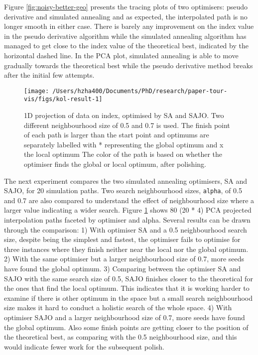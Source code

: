 Figure \ref{fig:noisy-better-geo} presents the tracing plots of two
optimisers: pseudo derivative and simulated annealing and as expected,
the interpolated path is no longer smooth in either case. There is
barely any improvement on the index value in the pseudo derivative
algorithm while the simulated annealing algorithm has managed to get
close to the index value of the theoretical best, indicated by the
horizontal dashed line. In the PCA plot, simulated annealing is able to
move gradually towards the theoretical best while the pseudo derivative
method breaks after the initial few attempts.

\begin{Schunk}
\begin{figure}

{\centering \texttt{[image: /Users/hzha400/Documents/PhD/research/paper-tour-vis/figs/kol-result-1]} 

}

\caption[1D projection of data  on  index,  optimised by SA and SAJO]{1D projection of data  on  index,  optimised by SA and SAJO. Two different neighbourhood size of 0.5 and 0.7 is used. The finish point of each path is larger than the start point and optimums are separately labelled with * representing the global optimum and x the local optimum The color of the path is based on whether the optimiser finds the global or local optimum, after polishing.}\label{fig:kol-result}
\end{figure}
\end{Schunk}

The next experiment compares the two simulated annealing optimisers, SA
and SAJO, for 20 simulation paths. Two search neighbourhood sizes,
\texttt{alpha}, of 0.5 and 0.7 are also compared to understand the
effect of neighbourhood size where a larger value indicating a wider
search. Figure \ref{fig:kol-result} shows 80 (20 * 4) PCA projected
interpolation paths faceted by optimiser and alpha. Several results can
be drawn through the comparison: 1) With optimiser SA and a 0.5
neighbourhood search size, despite being the simplest and fastest, the
optimiser fails to optimise for three instances where they finish
neither near the local nor the global optimum. 2) With the same
optimiser but a larger neighbourhood size of 0.7, more seeds have found
the global optimum. 3) Comparing between the optimiser SA and SAJO with
the same search size of 0.5, SAJO finishes closer to the theoretical for
the ones that find the local optimum. This indicates that it is working
harder to examine if there is other optimum in the space but a small
search neighbourhood size makes it hard to conduct a holistic search of
the whole space. 4) With optimiser SAJO and a larger neighbourhood size
of 0.7, more seeds have found the global optimum. Also some finish
points are getting closer to the position of the theoretical best, as
comparing with the 0.5 neighbourhood size, and this would indicate fewer
work for the subsequent polish.

